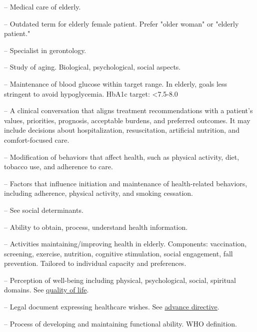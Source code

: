 -- Medical care of elderly.


-- Outdated term for elderly female patient. Prefer "older woman" or "elderly patient."

-- Specialist in gerontology.

-- Study of aging. Biological, psychological, social aspects.

-- Maintenance of blood glucose within target range. In elderly, goals less stringent to avoid hypoglycemia. HbA1c target: <7.5-8.0%

-- A clinical conversation that aligns treatment recommendations with a patient's values, priorities, prognosis, acceptable burdens, and preferred outcomes. It may include decisions about hospitalization, resuscitation, artificial nutrition, and comfort-focused care.

-- Modification of behaviors that affect health, such as physical activity, diet, tobacco use, and adherence to care.

-- Factors that influence initiation and maintenance of health-related behaviors, including adherence, physical activity, and smoking cessation.

-- See social determinants.

-- Ability to obtain, process, understand health information.

-- Activities maintaining/improving health in elderly. Components: vaccination, screening, exercise, nutrition, cognitive stimulation, social engagement, fall prevention. Tailored to individual capacity and preferences.

-- Perception of well-being including physical, psychological, social, spiritual domains. See \hyperlink{Quality of Life}{quality of life}.

-- Legal document expressing healthcare wishes. See \hyperlink{Advance Directive}{advance directive}.

-- Process of developing and maintaining functional ability. WHO definition.

